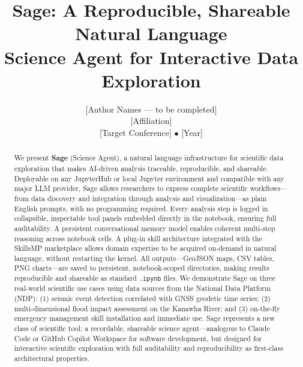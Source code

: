 \documentclass[10pt,twocolumn]{article}
\begin{document}
\title{\textbf{Sage: A Reproducible, Shareable Natural Language\\
Science Agent for Interactive Data Exploration}}

\author{
[Author Names --- to be completed]\\
\small [Affiliation]\\
\small [Target Conference] $\bullet$ [Year]
}

\date{}
\maketitle

\begin{abstract}
We present \textbf{Sage} (Science Agent), a natural language infrastructure for scientific data exploration that makes AI-driven analysis traceable, reproducible, and shareable. Deployable on any JupyterHub or local Jupyter environment and compatible with any major LLM provider, Sage allows researchers to express complete scientific workflows---from data discovery and integration through analysis and visualization---as plain English prompts, with no programming required. Every analysis step is logged in collapsible, inspectable tool panels embedded directly in the notebook, ensuring full auditability. A persistent conversational memory model enables coherent multi-step reasoning across notebook cells. A plug-in skill architecture integrated with the SkillsMP marketplace allows domain expertise to be acquired on-demand in natural language, without restarting the kernel. All outputs---GeoJSON maps, CSV tables, PNG charts---are saved to persistent, notebook-scoped directories, making results reproducible and shareable as standard \texttt{.ipynb} files. We demonstrate Sage on three real-world scientific use cases using data sources from the National Data Platform (NDP): (1) seismic event detection correlated with GNSS geodetic time series; (2) multi-dimensional flood impact assessment on the Kanawha River; and (3) on-the-fly emergency management skill installation and immediate use. Sage represents a new class of scientific tool: a recordable, shareable science agent---analogous to Claude Code or GitHub Copilot Workspace for software development, but designed for interactive scientific exploration with full auditability and reproducibility as first-class architectural properties.
\end{abstract}

\end{document}
